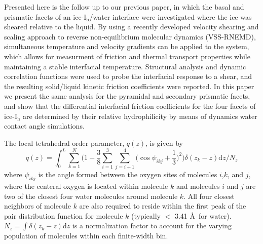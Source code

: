 \documentclass{pnastwo}
\begin{document}
\begin{article}
Presented here is the follow up to our previous paper\cite{Louden13}, in which
the basal and prismatic facets of an ice-I$_\mathrm{h}$/water interface were
investigated where the ice was sheared relative to the liquid. By using a 
recently developed velocity shearing and scaling approach to reverse 
non-equilibrium molecular dynamics (VSS-RNEMD), simultaneous temperature and 
velocity gradients can be applied to the system, which allows for measurment
of friction and thermal transport properties while maintaining a stable 
interfacial temperature\cite{Kuang12}. Structural analysis and dynamic
correlation functions were used to probe the interfacial response to a shear, 
and the resulting solid/liquid kinetic friction coefficients were reported.
In this paper we present the same analysis for the pyramidal and secondary 
prismatic facets, and show that the differential interfacial friction 
coefficients for the four facets of ice-I$_\mathrm{h}$ are determined by their 
relative hydrophilicity by means of dynamics water contact angle
simulations. 

The local tetrahedral order parameter, $q(z)$, is given by
\begin{equation}
q(z) = \int_0^L \sum_{k=1}^{N} \Bigg(1 -\frac{3}{8}\sum_{i=1}^{3}
\sum_{j=i+1}^{4} \bigg(\cos\psi_{ikj}+\frac{1}{3}\bigg)^2\Bigg)
\delta(z_{k}-z)\mathrm{d}z \Bigg/ N_z
\label{eq:qz}
\end{equation}
where $\psi_{ikj}$ is the angle formed between the oxygen sites of molecules
$i$,$k$, and $j$, where the centeral oxygen is located within molecule $k$ and 
molecules $i$ and $j$ are two of the closest four water molecules
around molecule $k$. All four closest neighbors of molecule $k$ are also
required to reside within the first peak of the pair distribution function
for molecule $k$ (typically $<$ 3.41 \AA\ for water). 
$N_z = \int\delta(z_k - z) \mathrm{d}z$ is a normalization factor to account 
for the varying population of molecules within each finite-width bin.



\end{article}
\end{document}
